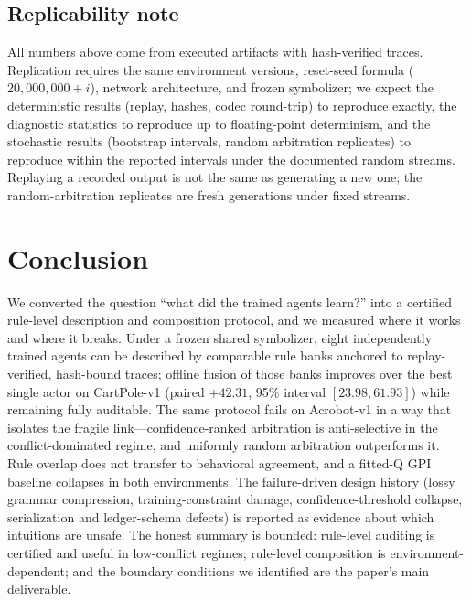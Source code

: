 \documentclass[11pt]{article}
\begin{document}
\subsection{Replicability note}
\label{sec:discussion:replication}

All numbers above come from executed artifacts with hash-verified traces. Replication requires the
same environment versions, reset-seed formula ($20{,}000{,}000+i$), network architecture, and
frozen symbolizer; we expect the deterministic results (replay, hashes, codec round-trip) to
reproduce exactly, the diagnostic statistics to reproduce up to floating-point determinism, and the
stochastic results (bootstrap intervals, random arbitration replicates) to reproduce within the
reported intervals under the documented random streams. Replaying a recorded output is not the same
as generating a new one; the random-arbitration replicates are fresh generations under fixed
streams.

\section{Conclusion}
\label{sec:conclusion}

We converted the question ``what did the trained agents learn?'' into a certified rule-level
description and composition protocol, and we measured where it works and where it breaks. Under a
frozen shared symbolizer, eight independently trained agents can be described by comparable rule
banks anchored to replay-verified, hash-bound traces; offline fusion of those banks improves over
the best single actor on CartPole-v1 (paired $+42.31$, 95\% interval $[23.98,61.93]$) while
remaining fully auditable. The same protocol fails on Acrobot-v1 in a way that isolates the
fragile link---confidence-ranked arbitration is anti-selective in the conflict-dominated regime, and
uniformly random arbitration outperforms it. Rule overlap does not transfer to behavioral
agreement, and a fitted-Q GPI baseline collapses in both environments. The failure-driven design
history (lossy grammar compression, training-constraint damage, confidence-threshold collapse,
serialization and ledger-schema defects) is reported as evidence about which intuitions are unsafe.
The honest summary is bounded: rule-level auditing is certified and useful in low-conflict regimes;
rule-level composition is environment-dependent; and the boundary conditions we identified are the
paper's main deliverable.
\end{document}
